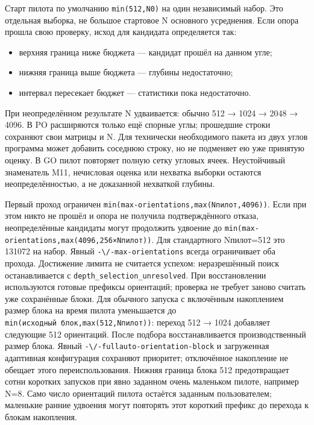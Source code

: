 Старт пилота по умолчанию \texttt{min(512,N0)} на один независимый
набор. Это отдельная выборка, не большое стартовое N основного
усреднения. Если опора прошла свою проверку, исход для кандидата
определяется так:

\begin{itemize}
\tightlist
\item
  верхняя граница ниже бюджета --- кандидат прошёл на данном угле;
\item
  нижняя граница выше бюджета --- глубины недостаточно;
\item
  интервал пересекает бюджет --- статистики пока недостаточно.
\end{itemize}

При неопределённом результате N удваивается: обычно 512 → 1024 → 2048 →
4096. В PO расширяются только ещё спорные углы; прошедшие строки
сохраняют свои матрицы и N. Для технически необходимого пакета из двух
углов программа может добавить соседнюю строку, но не подменяет ею уже
принятую оценку. В GO пилот повторяет полную сетку угловых ячеек.
Неустойчивый знаменатель M11, нечисловая оценка или нехватка выборки
остаются неопределённостью, а не доказанной нехваткой глубины.

Первый проход ограничен \texttt{min(max-orientations,max(Nпилот,4096))}.
Если при этом никто не прошёл и опора не получила подтверждённого
отказа, неопределённые кандидаты могут продолжить удвоение до
\texttt{min(max-orientations,max(4096,256×Nпилот))}. Для стандартного
Nпилот=512 это 131072 на набор. Явный \nolinkurl{-\/-max-orientations}
всегда ограничивает оба прохода. Достижение лимита не считается успехом:
неразрешённый поиск останавливается с
\nolinkurl{depth_selection_unresolved}. При восстановлении используются
готовые префиксы ориентаций; проверка не требует заново считать уже
сохранённые блоки. Для обычного запуска с включённым накоплением размер
блока на время пилота уменьшается до
\texttt{min(исходный\ блок,max(512,Nпилот))}: переход 512 → 1024
добавляет следующие 512 ориентаций. После подбора восстанавливается
производственный размер блока. Явный
\nolinkurl{-\/-fullauto-orientation-block} и загруженная адаптивная
конфигурация сохраняют приоритет; отключённое накопление не обещает
этого переиспользования. Нижняя граница блока 512 предотвращает сотни
коротких запусков при явно заданном очень маленьком пилоте, например
N=8. Само число ориентаций пилота остаётся заданным пользователем;
маленькие ранние удвоения могут повторять этот короткий префикс до
перехода к блокам накопления.

